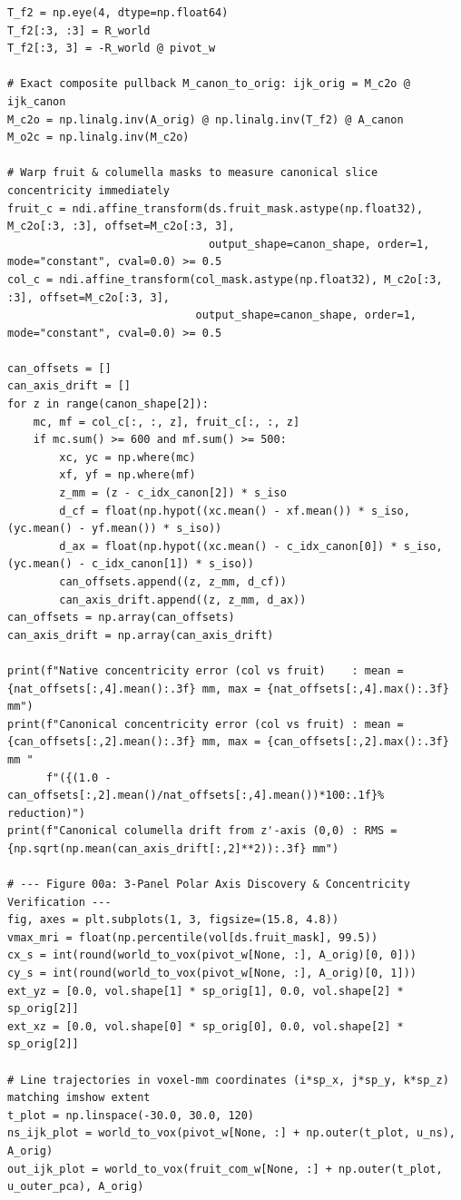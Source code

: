 \documentclass[10pt,a4paper]{article}
\renewcommand{\_}{\origunderscore\allowbreak}
\begin{document}
\begin{codebox}
\begin{lstlisting}[style=pybmed]
T_f2 = np.eye(4, dtype=np.float64)
T_f2[:3, :3] = R_world
T_f2[:3, 3] = -R_world @ pivot_w

# Exact composite pullback M_canon_to_orig: ijk_orig = M_c2o @ ijk_canon
M_c2o = np.linalg.inv(A_orig) @ np.linalg.inv(T_f2) @ A_canon
M_o2c = np.linalg.inv(M_c2o)

# Warp fruit & columella masks to measure canonical slice concentricity immediately
fruit_c = ndi.affine_transform(ds.fruit_mask.astype(np.float32), M_c2o[:3, :3], offset=M_c2o[:3, 3],
                               output_shape=canon_shape, order=1, mode="constant", cval=0.0) >= 0.5
col_c = ndi.affine_transform(col_mask.astype(np.float32), M_c2o[:3, :3], offset=M_c2o[:3, 3],
                             output_shape=canon_shape, order=1, mode="constant", cval=0.0) >= 0.5

can_offsets = []
can_axis_drift = []
for z in range(canon_shape[2]):
    mc, mf = col_c[:, :, z], fruit_c[:, :, z]
    if mc.sum() >= 600 and mf.sum() >= 500:
        xc, yc = np.where(mc)
        xf, yf = np.where(mf)
        z_mm = (z - c_idx_canon[2]) * s_iso
        d_cf = float(np.hypot((xc.mean() - xf.mean()) * s_iso, (yc.mean() - yf.mean()) * s_iso))
        d_ax = float(np.hypot((xc.mean() - c_idx_canon[0]) * s_iso, (yc.mean() - c_idx_canon[1]) * s_iso))
        can_offsets.append((z, z_mm, d_cf))
        can_axis_drift.append((z, z_mm, d_ax))
can_offsets = np.array(can_offsets)
can_axis_drift = np.array(can_axis_drift)

print(f"Native concentricity error (col vs fruit)    : mean = {nat_offsets[:,4].mean():.3f} mm, max = {nat_offsets[:,4].max():.3f} mm")
print(f"Canonical concentricity error (col vs fruit) : mean = {can_offsets[:,2].mean():.3f} mm, max = {can_offsets[:,2].max():.3f} mm "
      f"({(1.0 - can_offsets[:,2].mean()/nat_offsets[:,4].mean())*100:.1f}% reduction)")
print(f"Canonical columella drift from z'-axis (0,0) : RMS = {np.sqrt(np.mean(can_axis_drift[:,2]**2)):.3f} mm")

# --- Figure 00a: 3-Panel Polar Axis Discovery & Concentricity Verification ---
fig, axes = plt.subplots(1, 3, figsize=(15.8, 4.8))
vmax_mri = float(np.percentile(vol[ds.fruit_mask], 99.5))
cx_s = int(round(world_to_vox(pivot_w[None, :], A_orig)[0, 0]))
cy_s = int(round(world_to_vox(pivot_w[None, :], A_orig)[0, 1]))
ext_yz = [0.0, vol.shape[1] * sp_orig[1], 0.0, vol.shape[2] * sp_orig[2]]
ext_xz = [0.0, vol.shape[0] * sp_orig[0], 0.0, vol.shape[2] * sp_orig[2]]

# Line trajectories in voxel-mm coordinates (i*sp_x, j*sp_y, k*sp_z) matching imshow extent
t_plot = np.linspace(-30.0, 30.0, 120)
ns_ijk_plot = world_to_vox(pivot_w[None, :] + np.outer(t_plot, u_ns), A_orig)
out_ijk_plot = world_to_vox(fruit_com_w[None, :] + np.outer(t_plot, u_outer_pca), A_orig)


\end{lstlisting}
\end{codebox}
\end{document}
